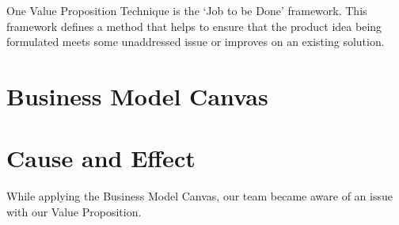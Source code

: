 \documentclass[a4paper,12pt]{article}
\begin{document}
One Value Proposition Technique is the `Job to be Done' framework. This
framework defines a method that helps to ensure that the product
idea being formulated meets some unaddressed issue or improves on an
existing solution.




\section{Business Model Canvas}
\label{sec:Business Model Canvas}



\section{Cause and Effect}
\label{sec:Cause and Effect}

While applying the Business Model Canvas, our team became aware of an
issue with our Value Proposition.
\end{document}
